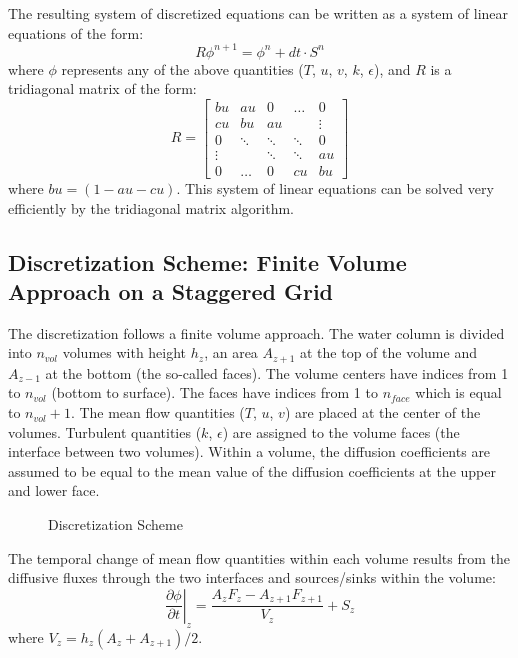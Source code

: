 \documentclass[paper=a4, fontsize=12pt]{article}
\begin{document}
\noindent The resulting system of discretized equations can be written as a system of linear equations of the form:
\begin{equation}
	R\phi^{n+1}=\phi^n+dt\cdot S^{n}
\end{equation}
where $\phi$ represents any of the above quantities ($T$, $u$, $v$, $k$, $\epsilon$), and $R$ is a tridiagonal matrix of the form:
\begin{equation}
	R=\begin{bmatrix}
	bu		&	au		&	0		&	\hdots	&	0  \\
	cu		&	bu		&	au		&	 		&	\vdots \\
	0		&	\ddots	&	\ddots	&	\ddots	&	0 \\
	\vdots	&			&	\ddots	&	\ddots	&	au \\
	0		&	\hdots	&	0		&	cu		&	bu
	\end{bmatrix}
\end{equation}
where $bu=(1-au-cu)$. This system of linear equations can be solved very efficiently by the tridiagonal matrix algorithm.

\subsection{Discretization Scheme: Finite Volume Approach on a Staggered Grid}
The discretization follows a finite volume approach. The water column is divided into $n_{vol}$ volumes with height $h_z$, an area $A_{z+1}$ at the top of the volume and $A_{z-1}$ at the bottom (the so-called faces). The volume centers have indices from 1 to $n_{vol}$ (bottom to surface). The faces have indices from 1 to $n_{face}$ which is equal to $n_{vol}+1$. The mean flow quantities ($T$, $u$, $v$) are placed at the center of the volumes. Turbulent quantities ($k$, $\epsilon$) are assigned to the volume faces (the interface between two volumes). Within a volume, the diffusion coefficients are assumed to be equal to the mean value of the diffusion coefficients at the upper and lower face.

\begin{figure}[h!]
	\centering
	\def\svgwidth{\textwidth}
	
	\caption{Discretization Scheme}
\end{figure}

The temporal change of mean flow quantities within each volume results from the diffusive fluxes through the two interfaces and sources/sinks within the volume:
\begin{equation}
	\left.\frac{\partial\phi}{\partial t}\right|_{z} = \frac{A_{z}F_{z}-A_{z+1}F_{z+1}}{V_z}+S_z
\end{equation}
where $V_z=h_z\left(A_z+A_{z+1}\right)/2$.
\end{document}
